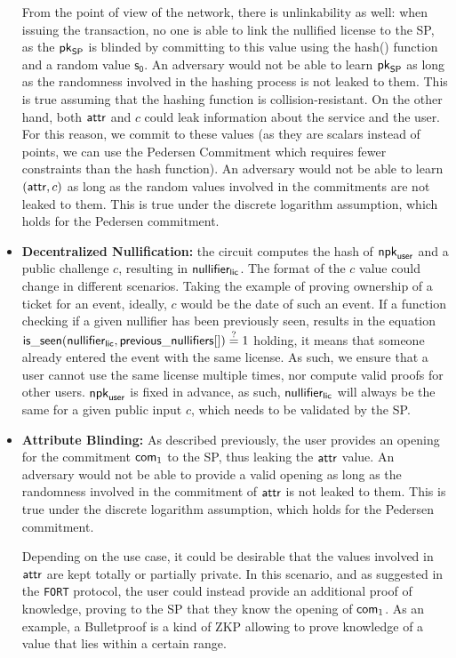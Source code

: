 \begin{itemize}
 From the point of view of the network, there is unlinkability as well: when issuing the transaction, no one is able to link the nullified license to the SP, as the $\mathsf{pk}_{\mathsf{SP}}$ is blinded by committing to this value using the \textsf{hash()} function and a random value $\mathsf{s_0}$. An adversary would not be able to learn $\mathsf{pk}_{\mathsf{SP}}$ as long as the randomness involved in the hashing process is not leaked to them. This is true assuming that the hashing function is collision-resistant. On the other hand, both $\mathsf{attr}$ and $c$ could leak information about the service and the user. For this reason, we commit to these values (as they are scalars instead of points, we can use the Pedersen Commitment which requires fewer constraints than the hash function). An adversary would not be able to learn $(\mathsf{attr}, c)$ as long as the random values involved in the commitments are not leaked to them. This is true under the discrete logarithm assumption, which holds for the Pedersen commitment.
 
 \item \textbf{Decentralized Nullification:} the circuit computes the hash of $\mathsf{npk}_{\mathsf{user}}$ and a public challenge $c$, resulting in $\mathsf{nullifier_{lic}}$. The format of the $c$ value could change in different scenarios. Taking the example of proving ownership of a ticket for an event, ideally, $c$ would be the date of such an event. If a function checking if a given nullifier has been previously seen, results in the equation $\mathsf{is\_seen}(\mathsf{nullifier_{lic}}, \mathsf{previous\_nullifiers}[]) \stackrel{?}{=} 1$ holding, it means that someone already entered the event with the same license. As such, we ensure that a user cannot use the same license multiple times, nor compute valid proofs for other users. $\mathsf{npk}_{\mathsf{user}}$ is fixed in advance, as such, $\mathsf{nullifier_{lic}}$ will always be the same for a given public input $c$, which needs to be validated by the SP.
 
\item \textbf{Attribute Blinding:} As described previously, the user provides an opening for the commitment $\mathsf{com}_1$ to the SP, thus leaking the $\mathsf{attr}$ value. An adversary would not be able to provide a valid opening as long as the randomness involved in the commitment of $\mathsf{attr}$ is not leaked to them. This is true under the discrete logarithm assumption, which holds for the Pedersen commitment.

Depending on the use case, it could be desirable that the values involved in $\mathsf{attr}$ are kept totally or partially private. In this scenario, and as suggested in the \verb!FORT! protocol, the user could instead provide an additional proof of knowledge, proving to the SP that they know the opening of $\mathsf{com}_1$. As an example, a Bulletproof is a kind of ZKP allowing to prove knowledge of a value that lies within a certain range. 
 
\end{itemize}

